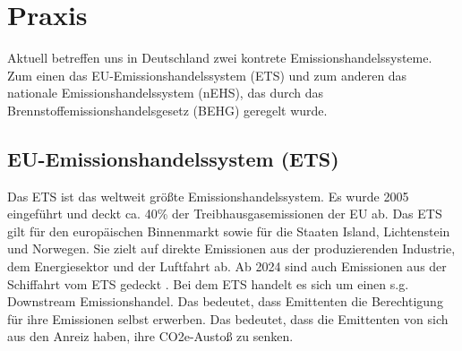 \chapter{Praxis}

Aktuell betreffen uns in Deutschland zwei kontrete Emissionshandelssysteme. Zum einen das EU-Emissionshandelssystem (ETS) und zum anderen das nationale Emissionshandelssystem (nEHS), das durch das Brennstoffemissionshandelsgesetz (BEHG) geregelt wurde.

\section{EU-Emissionshandelssystem (ETS)}

Das ETS ist das weltweit größte Emissionshandelssystem. Es wurde 2005 eingeführt und deckt ca. 40\% der Treibhausgasemissionen der EU ab. Das ETS gilt für den europäischen Binnenmarkt sowie für die Staaten Island, Lichtenstein und Norwegen. Sie zielt auf direkte Emissionen aus der produzierenden Industrie, dem Energiesektor und der Luftfahrt ab. Ab 2024 sind auch Emissionen aus der Schiffahrt vom ETS gedeckt \cite{eu.2023}.
Bei dem ETS handelt es sich um einen s.g. Downstream Emissionshandel. Das bedeutet, dass Emittenten die Berechtigung für ihre Emissionen selbst erwerben. Das bedeutet, dass die Emittenten von sich aus den Anreiz haben, ihre CO2e-Austoß zu senken.  